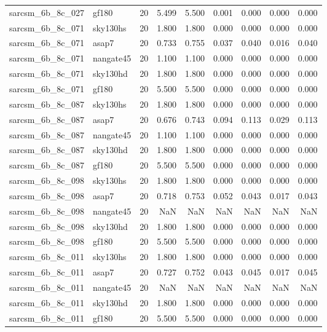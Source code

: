 \begin{tabular}{llrrrrrrr}
sarcsm\_6b\_8c\_027 & gf180 & 20 & 5.499 & 5.500 & 0.001 & 0.000 & 0.000 & 0.000 \\
sarcsm\_6b\_8c\_071 & sky130hs & 20 & 1.800 & 1.800 & 0.000 & 0.000 & 0.000 & 0.000 \\
sarcsm\_6b\_8c\_071 & asap7 & 20 & 0.733 & 0.755 & 0.037 & 0.040 & 0.016 & 0.040 \\
sarcsm\_6b\_8c\_071 & nangate45 & 20 & 1.100 & 1.100 & 0.000 & 0.000 & 0.000 & 0.000 \\
sarcsm\_6b\_8c\_071 & sky130hd & 20 & 1.800 & 1.800 & 0.000 & 0.000 & 0.000 & 0.000 \\
sarcsm\_6b\_8c\_071 & gf180 & 20 & 5.500 & 5.500 & 0.000 & 0.000 & 0.000 & 0.000 \\
sarcsm\_6b\_8c\_087 & sky130hs & 20 & 1.800 & 1.800 & 0.000 & 0.000 & 0.000 & 0.000 \\
sarcsm\_6b\_8c\_087 & asap7 & 20 & 0.676 & 0.743 & 0.094 & 0.113 & 0.029 & 0.113 \\
sarcsm\_6b\_8c\_087 & nangate45 & 20 & 1.100 & 1.100 & 0.000 & 0.000 & 0.000 & 0.000 \\
sarcsm\_6b\_8c\_087 & sky130hd & 20 & 1.800 & 1.800 & 0.000 & 0.000 & 0.000 & 0.000 \\
sarcsm\_6b\_8c\_087 & gf180 & 20 & 5.500 & 5.500 & 0.000 & 0.000 & 0.000 & 0.000 \\
sarcsm\_6b\_8c\_098 & sky130hs & 20 & 1.800 & 1.800 & 0.000 & 0.000 & 0.000 & 0.000 \\
sarcsm\_6b\_8c\_098 & asap7 & 20 & 0.718 & 0.753 & 0.052 & 0.043 & 0.017 & 0.043 \\
sarcsm\_6b\_8c\_098 & nangate45 & 20 & NaN & NaN & NaN & NaN & NaN & NaN \\
sarcsm\_6b\_8c\_098 & sky130hd & 20 & 1.800 & 1.800 & 0.000 & 0.000 & 0.000 & 0.000 \\
sarcsm\_6b\_8c\_098 & gf180 & 20 & 5.500 & 5.500 & 0.000 & 0.000 & 0.000 & 0.000 \\
sarcsm\_6b\_8c\_011 & sky130hs & 20 & 1.800 & 1.800 & 0.000 & 0.000 & 0.000 & 0.000 \\
sarcsm\_6b\_8c\_011 & asap7 & 20 & 0.727 & 0.752 & 0.043 & 0.045 & 0.017 & 0.045 \\
sarcsm\_6b\_8c\_011 & nangate45 & 20 & NaN & NaN & NaN & NaN & NaN & NaN \\
sarcsm\_6b\_8c\_011 & sky130hd & 20 & 1.800 & 1.800 & 0.000 & 0.000 & 0.000 & 0.000 \\
sarcsm\_6b\_8c\_011 & gf180 & 20 & 5.500 & 5.500 & 0.000 & 0.000 & 0.000 & 0.000 \\

\end{tabular}
